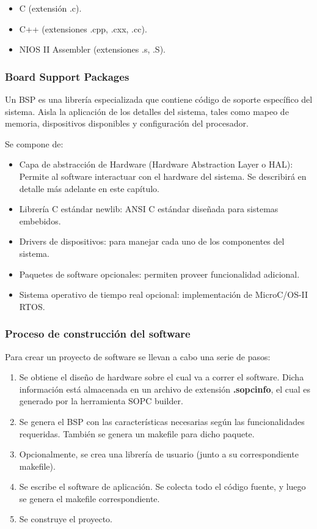 \begin{itemize}
	\item C (extensión .c).
	\item C++ (extensiones .cpp, .cxx, .cc).
	\item NIOS II Assembler (extensiones .s, .S).
\end{itemize}


\subsubsection{Board Support Packages}

Un BSP es una librería especializada que contiene código de soporte específico del sistema. Aisla la aplicación de los detalles del sistema, tales como mapeo de memoria, dispositivos disponibles y configuración del procesador.

Se compone de:

\begin{itemize}
	\item Capa de abstracción de Hardware (Hardware Abstraction Layer o HAL): Permite al software interactuar con el hardware del sistema. Se describirá en detalle más adelante en este capítulo.
	\item Librería C estándar newlib: ANSI C estándar diseñada para sistemas embebidos.
	\item Drivers de dispositivos: para manejar cada uno de los componentes del sistema.
	\item Paquetes de software opcionales: permiten proveer funcionalidad adicional.
	\item Sistema operativo de tiempo real opcional: implementación de MicroC/OS-II RTOS.
\end{itemize}

\subsubsection{Proceso de construcción del software}

Para crear un proyecto de software se llevan a cabo una serie de pasos:

\begin{enumerate}
	\item Se obtiene el diseño de hardware sobre el cual va a correr el software. Dicha información está almacenada en un archivo de extensión \textbf{.sopcinfo}, el cual es generado por la herramienta SOPC builder.
	\item Se genera el BSP con las características necesarias según las funcionalidades requeridas. También se genera un makefile para dicho paquete.
	\item Opcionalmente, se crea una librería de usuario (junto a su correspondiente makefile).
	\item Se escribe el software de aplicación. Se colecta todo el código fuente, y luego se genera el makefile correspondiente.
	\item Se construye el proyecto.
\end{enumerate}


